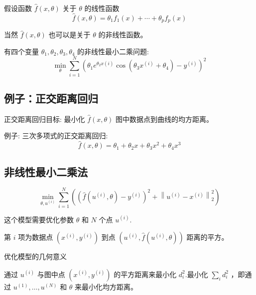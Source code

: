 假设函数 $ \hat{f}(x, \theta) $ 关于 $ \theta $ 的线性函数
$$
\hat{f}(x, \theta)=\theta_{1} f_{1}(x)+\cdots+\theta_{p} f_{p}(x)
$$

当然 $ \hat{f}(x, \theta) $ 也可以是关于 $ \theta $ 的非线性函数。

\begin{example}
    有四个变量 $ \theta_{1}, \theta_{2}, \theta_{3}, \theta_{4} $ 的非线性最小二乘问题:
$$
\min _{\theta} \sum_{i=1}^{N}\left(\theta_{1} e^{\theta_{2} x(i)} \cos \left(\theta_{3} x^{(i)}+\theta_{4}\right)-y^{(i)}\right)^{2}
$$

\end{example}

\subsection{例子：正交距离回归}

正交距离回归目标: 最小化 $ \hat{f}(x, \theta) $ 图中数据点到曲线的均方距离。 

例子: 三次多项式的正交距离回归:
$$
\hat{f}(x, \theta)=\theta_{1}+\theta_{2} x+\theta_{3} x^{2}+\theta_{4} x^{3}
$$


\subsection{非线性最小二乘法}

\begin{problem}
    $$
\min _{\theta, u^{(i)}} \sum_{i=1}^{N}\left(\left(\hat{f}\left(u^{(i)}, \theta\right)-y^{(i)}\right)^{2}+\left\|u^{(i)}-x^{(i)}\right\|_{2}^{2}\right)
$$

这个模型需要优化参数 $ \theta $ 和 $ {N} $ 个点 $ u^{(i)} $.
\end{problem}

第 $ i $ 项为数据点 $ \left(x^{(i)}, y^{(i)}\right) $ 到点 $ \left(u^{(i)}, \hat{f}\left(u^{(i)}, \theta\right)\right) $ 距离的平方。

\begin{FigureCenter}{优化模型的几何意义}
    
\end{FigureCenter}

通过 $ u^{(i)} $ 与图中点 $ \left(x^{(i)}, y^{(i)}\right) $ 的平方距离来最小化 $ d_{i}^{2} $.最小化 $ \sum_{i} d_{i}^{2} $ ，即通过 $ u^{(1)}, \ldots, u^{(N)} $ 和 $ \theta $ 来最小化均方距离。

